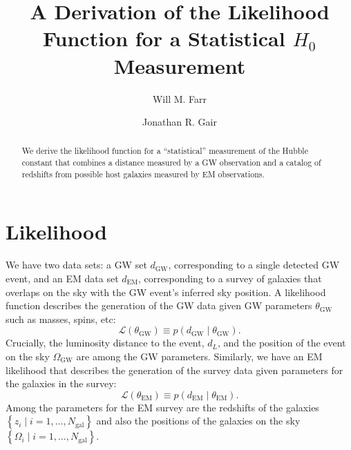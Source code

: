 \documentclass[modern]{aastex62}
\newcommand{\dEM}{d_{\mathrm{EM}}}
\newcommand{\dGW}{d_{\mathrm{GW}}}
\newcommand{\Ngal}{N_{\mathrm{gal}}}
\newcommand{\OGW}{\Omega_{\mathrm{GW}}}
\newcommand{\thetaEM}{\theta_{\mathrm{EM}}}
\newcommand{\thetaGW}{\theta_{\mathrm{GW}}}
\begin{document}
\title{A Derivation of the Likelihood Function for a Statistical $H_0$
Measurement}

\author{Will M. Farr}





\author{Jonathan R. Gair}



\begin{abstract}
%
  We derive the likelihood function for a ``statistical'' measurement of the
  Hubble constant that combines a distance measured by a \ac{GW} observation and
  a catalog of redshifts from possible host galaxies measured by \ac{EM}
  observations.
%
\end{abstract}

\section{Likelihood}

We have two data sets: a \ac{GW} set $\dGW$, corresponding to a single detected
\ac{GW} event, and an \ac{EM} data set $\dEM$, corresponding to a survey of
galaxies that overlaps on the sky with the \ac{GW} event's inferred sky
position.  A likelihood function describes the generation of the \ac{GW} data
given \ac{GW} parameters $\thetaGW$ such as masses, spins, etc:
%
\begin{equation}
    \mathcal{L}\left( \thetaGW \right) \equiv p\left( \dGW \mid \thetaGW \right).
\end{equation}
%
Crucially, the luminosity distance to the event, $d_L$, and the position of the
event on the sky $\OGW$ are among the \ac{GW} parameters.  Similarly, we have an
\ac{EM} likelihood that describes the generation of the survey data given
parameters for the galaxies in the survey:
%
\begin{equation}
    \mathcal{L} \left( \thetaEM \right) \equiv p\left( \dEM \mid \thetaEM \right).
\end{equation}
%
Among the parameters for the \ac{EM} survey are the redshifts of the galaxies
$\left\{ z_i \mid i = 1, \ldots, \Ngal \right\}$ and also the positions of the
galaxies on the sky $\left\{ \Omega_i \mid i = 1, \ldots, \Ngal \right\}$.
\end{document}
